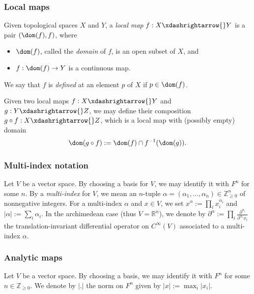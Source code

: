 \subsubsection{Local maps}\label{sec:local-maps}
Given topological spaces $X$ and $Y$, a \emph{local map} $f : X \xdashrightarrow{} Y$ is a pair $(\dom(f), f)$, where
\begin{itemize}
\item $\dom(f)$, called the \emph{domain} of $f$, is an open subset of $X$, and
\item $f : \dom(f) \rightarrow Y$ is a continuous map.
\end{itemize}
We say that $f$ is \emph{defined} at an element $p$ of $X$ if $p \in \dom(f)$.

Given two local maps $f : X \xdashrightarrow{} Y$ and $g : Y \xdashrightarrow{} Z$, we may define their composition $g \circ f : X \xdashrightarrow{} Z$, which is a local map with (possibly empty) domain
\begin{equation*}
  \dom(g \circ f) := \dom(f) \cap f^{-1}(\dom(g)).
\end{equation*}

\subsubsection{Multi-index notation}\label{sec:multi-index-notation}
Let $V$ be a vector space.  By choosing a basis for $V$, we may identify it with $F^n$ for some $n$.  By a \emph{multi-index} for $V$, we mean an $n$-tuple $\alpha = (\alpha_1, \dotsc, \alpha_n ) \in \mathbb{Z} _{\geq 0} ^n$ of nonnegative integers.  For a multi-index $\alpha$ and $x \in V$, we set $x^\alpha := \prod_i x_i^{\alpha_i}$ and $|\alpha| := \sum_i \alpha_i$.  In the archimedean case (thus $V = \mathbb{R}^n$), we denote by $\partial^\alpha := \prod_i \frac{\partial^{\alpha_i}}{\partial^{\alpha_i} x_i}$ the translation-invariant differential operator on $C^\infty(V)$ associated to a multi-index $\alpha$.

\subsubsection{Analytic maps}\label{sec:analytic-functions}
Let $V$ be a vector space.  By choosing a basis, we may identify it with $F^n$ for some $n \in \mathbb{Z}_{\geq 0}$.  We denote by $|.|$ the norm on $F^n$ given by $|x| := \max_{i} |x_i|$.


